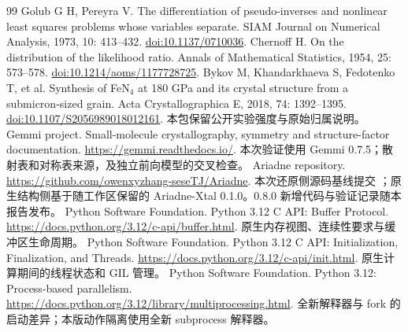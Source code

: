 \begin{thebibliography}{99}
 Golub G H, Pereyra V. The differentiation of pseudo-inverses and nonlinear least squares problems whose variables separate. SIAM Journal on Numerical Analysis, 1973, 10: 413--432. \href{https://doi.org/10.1137/0710036}{doi:10.1137/0710036}.
 Chernoff H. On the distribution of the likelihood ratio. Annals of Mathematical Statistics, 1954, 25: 573--578. \href{https://doi.org/10.1214/aoms/1177728725}{doi:10.1214/aoms/1177728725}.
 Bykov M, Khandarkhaeva S, Fedotenko T, et al. Synthesis of FeN$_4$ at 180 GPa and its crystal structure from a submicron-sized grain. Acta Crystallographica E, 2018, 74: 1392--1395. \href{https://doi.org/10.1107/S2056989018012161}{doi:10.1107/S2056989018012161}. 本包保留公开实验强度与原始归属说明。
 Gemmi project. Small-molecule crystallography, symmetry and structure-factor documentation. \url{https://gemmi.readthedocs.io/}. 本次验证使用 Gemmi 0.7.5；散射表和对称表来源，及独立前向模型的交叉检查。
 Ariadne repository. \url{https://github.com/owenxyzhang-seseTJ/Ariadne}. 本次还原侧源码基线提交 ；原生结构侧基于随工作区保留的 Ariadne-Xtal 0.1.0。0.8.0 新增代码与验证记录随本报告发布。
 Python Software Foundation. Python 3.12 C API: Buffer Protocol. \url{https://docs.python.org/3.12/c-api/buffer.html}. 原生内存视图、连续性要求与缓冲区生命周期。
 Python Software Foundation. Python 3.12 C API: Initialization, Finalization, and Threads. \url{https://docs.python.org/3.12/c-api/init.html}. 原生计算期间的线程状态和 GIL 管理。
 Python Software Foundation. Python 3.12: Process-based parallelism. \url{https://docs.python.org/3.12/library/multiprocessing.html}. 全新解释器与 fork 的启动差异；本版动作隔离使用全新 subprocess 解释器。
\end{thebibliography}
